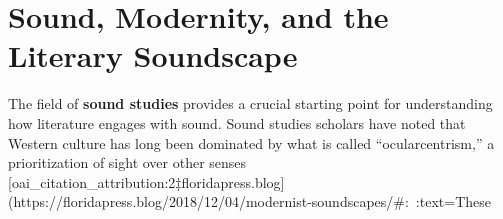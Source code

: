 \documentclass[12pt]{report}
\begin{document}
\section{Sound, Modernity, and the Literary Soundscape}
The field of \textbf{sound studies} provides a crucial starting point for understanding how literature engages with sound. Sound studies scholars have noted that Western culture has long been dominated by what is called “ocularcentrism,” a prioritization of sight over other senses [oai_citation_attribution:2‡floridapress.blog](https://floridapress.blog/2018/12/04/modernist-soundscapes/#:~:text=These%
\end{document}
